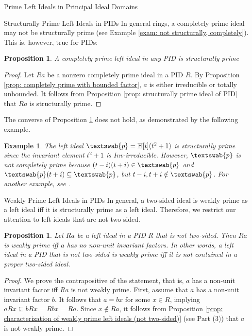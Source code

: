 \documentclass[11pt,a4paper]{article}
\theoremstyle{theorem}
\newtheorem{proposition}[theorem]{Proposition}
\newtheorem{example}{Example}[section]
\numberwithin{equation}{section}
\begin{document}
\begin{section}{Prime Left Ideals in Principal Ideal Domains}
\begin{subsection}{Structurally Prime Left Ideals in PIDs}
		In general rings, a completely prime ideal may not be structurally prime (see Example \ref{exam: not structurally, completely}). This is, however, true for PIDs:  
		\begin{proposition}\label{prop: structurally prime implies completely prim in PID}
			A completely prime left ideal in any PID is structurally prime 
		\end{proposition}
		\begin{proof}
			Let \(Ra\) be a nonzero completely prime ideal in a PID \(R\). By Proposition \ref{prop: completely prime with bounded factor}, \(a\) is either irreducible or totally unbounded. It follows from Proposition \ref{prop: structurally prime ideal of PID} that  \(Ra\) is structurally prime.   	
		\end{proof}
		The converse of Proposition \ref{prop: structurally prime implies completely prim in PID} does not hold, as demonstrated by the following example. 
		\begin{example}\label{exam: structurally not completely in a PID}
			The left ideal \(\textswab{p} = \mathbb{H}[t](t^2+1)\) is structurally prime since the invariant element \(t^2+1\) is Inv-irreducible.  However, \(\textswab{p}\) is not completely prime because \((t-i)(t+i)\in \textswab{p}\) and \(\textswab{p}(t+i)\subseteq \textswab{p}\), but \(t-i,t+i\notin \textswab{p}\). For another example, see \cite[Example 1]{alon2022completely}.
		\end{example}

		
	\end{subsection}
	\begin{subsection}{Weakly Prime Left Ideals in PIDs}
		In general, a two-sided ideal is weakly prime as a left ideal iff it is structurally prime as a left ideal. Therefore, we restrict our attention to left ideals that are not two-sided.  
		\begin{proposition}\label{prop: weakly prime ideal of PID }
			Let \(Ra\) be a left ideal in a PID \(R\) that is not two-sided. Then \(Ra\)  is  weakly prime iff  \( a \) has no non-unit invariant factors. In other words, a left ideal in a PID that is not two-sided is weakly prime iff it is not contained in a proper two-sided ideal. 
		\end{proposition}
		\begin{proof}
			We prove the contrapositive of the statement, that is,  \( a \) has a non-unit invariant factor  iff \(Ra\) is not weakly prime. First, assume that  \( a \) has a non-unit invariant factor \(b\). It follows that \(a = bx\) for some \(x\in R\), implying \(aRx \subseteq bRx = Rbx = Ra\). Since \(x\notin Ra\), it follows from Proposition \ref{prop: characterization of weakly prime left ideals (not two-sided)} (see Part (3)) that \(a\) is not weakly prime. 
			

\end{proof}
\end{subsection}
\end{section}
\end{document}
